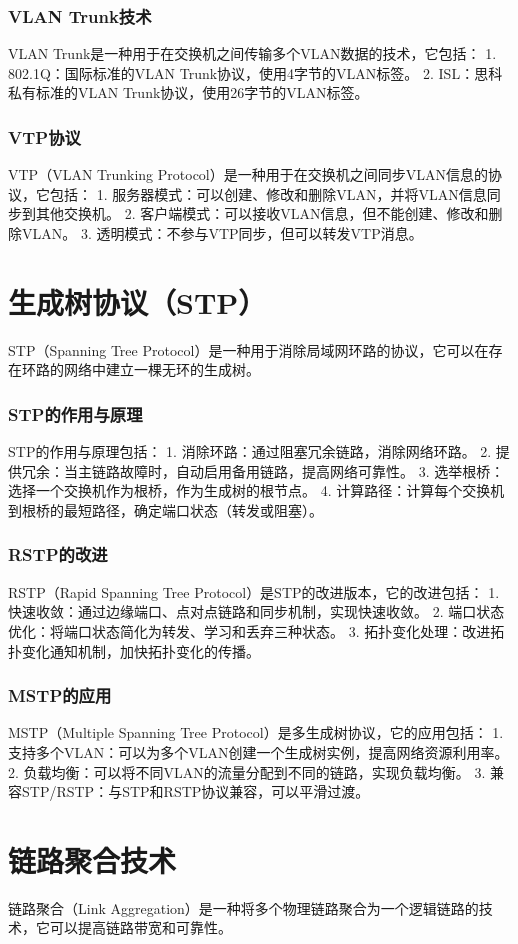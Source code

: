 \documentclass{book}
\begin{document}
\subsubsection{VLAN Trunk技术}
VLAN Trunk是一种用于在交换机之间传输多个VLAN数据的技术，它包括：
1. 802.1Q：国际标准的VLAN Trunk协议，使用4字节的VLAN标签。
2. ISL：思科私有标准的VLAN Trunk协议，使用26字节的VLAN标签。
\subsubsection{VTP协议}
VTP（VLAN Trunking Protocol）是一种用于在交换机之间同步VLAN信息的协议，它包括：
1. 服务器模式：可以创建、修改和删除VLAN，并将VLAN信息同步到其他交换机。
2. 客户端模式：可以接收VLAN信息，但不能创建、修改和删除VLAN。
3. 透明模式：不参与VTP同步，但可以转发VTP消息。
\section{生成树协议（STP）}
STP（Spanning Tree Protocol）是一种用于消除局域网环路的协议，它可以在存在环路的网络中建立一棵无环的生成树。
\subsubsection{STP的作用与原理}
STP的作用与原理包括：
1. 消除环路：通过阻塞冗余链路，消除网络环路。
2. 提供冗余：当主链路故障时，自动启用备用链路，提高网络可靠性。
3. 选举根桥：选择一个交换机作为根桥，作为生成树的根节点。
4. 计算路径：计算每个交换机到根桥的最短路径，确定端口状态（转发或阻塞）。
\subsubsection{RSTP的改进}
RSTP（Rapid Spanning Tree Protocol）是STP的改进版本，它的改进包括：
1. 快速收敛：通过边缘端口、点对点链路和同步机制，实现快速收敛。
2. 端口状态优化：将端口状态简化为转发、学习和丢弃三种状态。
3. 拓扑变化处理：改进拓扑变化通知机制，加快拓扑变化的传播。
\subsubsection{MSTP的应用}
MSTP（Multiple Spanning Tree Protocol）是多生成树协议，它的应用包括：
1. 支持多个VLAN：可以为多个VLAN创建一个生成树实例，提高网络资源利用率。
2. 负载均衡：可以将不同VLAN的流量分配到不同的链路，实现负载均衡。
3. 兼容STP/RSTP：与STP和RSTP协议兼容，可以平滑过渡。
\section{链路聚合技术}
链路聚合（Link Aggregation）是一种将多个物理链路聚合为一个逻辑链路的技术，它可以提高链路带宽和可靠性。
\end{document}
